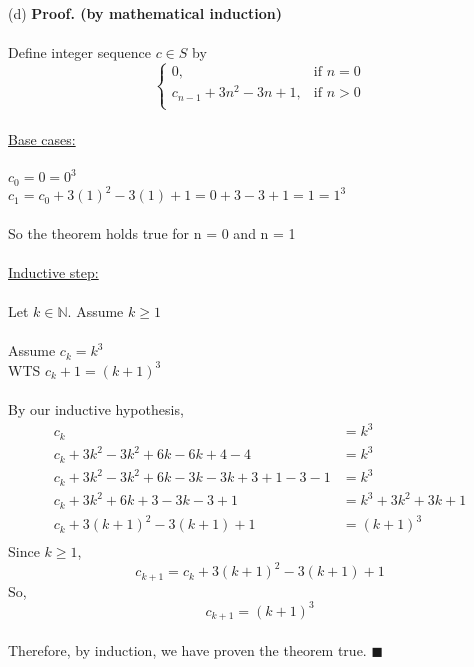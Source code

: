 \documentclass{article}
\newcommand{\N}{\mathbb{N}}
\begin{document}
\begin{enumerate}
	(d)  \textbf{Proof. (by mathematical induction)} \\\\
	Define integer sequence $c\in S$ by \\
	\[ \begin{cases} 
	0, & \text{if }n = 0 \\
	c_{n-1}+3n^2-3n+1, & \text{if }n>0 \\
	\end{cases}
	\]
	\\
	\underline{Base cases:} \\\\
	$c_0 = 0 = 0^3$\\
	$c_1 = c_0 + 3(1)^2 - 3(1) + 1 = 0 + 3 - 3 +1 = 1 = 1^3$\\\\
	So the theorem holds true for n = 0 and n = 1\\\\
	\underline{Inductive step:} \\\\
	Let $k\in \N $. Assume $k\geq 1$\\\\
	Assume $c_k = k^3$\\
	WTS $c_k+1 = (k+1)^3$\\\\
	By our inductive hypothesis,
	\begin{align*}
	c_k &= k^3\\
	c_k +3k^2 -3k^2 +6k -6k +4 -4 &= k^3\\
	c_k +3k^2 -3k^2 +6k -3k -3k +3 +1 -3 -1 &= k^3\\
	c_k +3k^2 +6k +3 -3k -3 +1 &= k^3 + 3k^2 +3k +1\\
	c_k + 3(k+1)^2 -3(k+1) +1 &= (k+1)^3\\
	\end{align*}
	Since $k\geq 1$, $$c_{k+1} = c_k + 3(k+1)^2 - 3(k+1) + 1$$
	So, $$c_{k+1} = (k+1)^3$$\\
	Therefore, by induction, we have proven the theorem true. \null\hfill $\blacksquare$\\\\
	

\end{enumerate}
\end{document}
